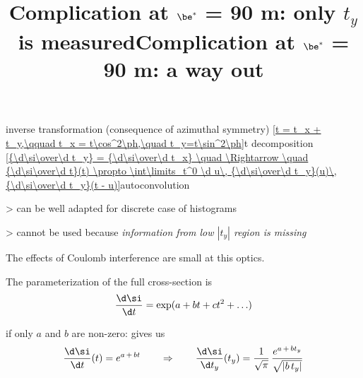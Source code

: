 

\newpage %
\title{Complication at $\mathbf{\be^*}$ = 90 m: only $t_y$ is measured}


\> inverse transformation (consequence of azimuthal symmetry)
\eqref{t = t_x + t_y,\qquad t_x = t\cos^2\ph,\quad t_y=t\sin^2\ph}{t decomposition}
\eqref{{\d\si\over\d t_y} = {\d\si\over\d t_x} \quad \Rightarrow \quad {\d\si\over\d t}(t) \propto \int\limits_t^0 \d u\, {\d\si\over\d t_y}(u)\, {\d\si\over\d t_y}(t - u)}{autoconvolution}\par
\>> can be well adapted for discrete case of histograms\par
\vskip3mm
\>> cannot be used because \em{information from low $|t_y|$ region is missing}


\newpage %
\title{Complication at $\mathbf{\be^*}$ = 90 m: a way out}
\parskip3mm

\> The effects of Coulomb interference are small at this optics.

\> The parameterization of the full cross-section is
$${\d\si\over\d t} = \exp(a + bt + ct^2 + \ldots)$$

\> if only $a$ and $b$ are non-zero:  gives us
$${\d\si\over\d t}(t) = e^{a\, +\, bt}  \qquad\Rightarrow\qquad  {\d\si\over\d t_y}(t_y) = {1\over\sqrt{\pi}}\, {e^{a\, +\, bt_y}\over\sqrt{|b\,t_y|}}$$

